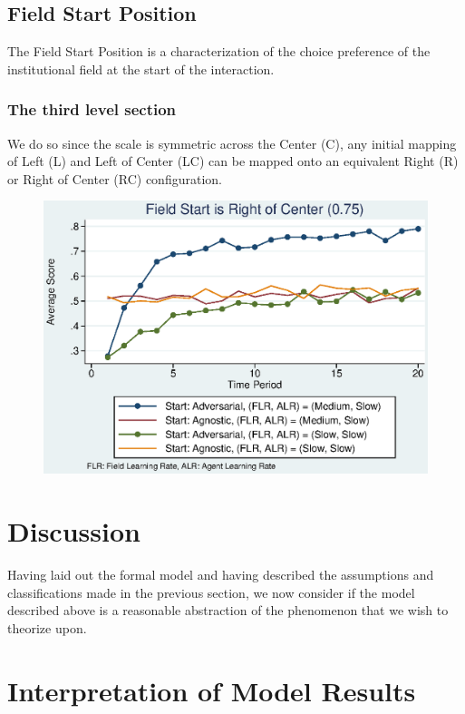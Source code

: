 \documentclass[12pt,letterpaper]{article}
\begin{document}
\subsection{Field Start Position}
The Field Start Position is a characterization of the choice preference of the institutional field at the start of the interaction. 
\subsubsection{The third level section}
We do so since the scale is symmetric across the Center (C), any initial mapping of Left (L) and Left of Center (LC) can be mapped onto an equivalent Right (R) or Right of Center (RC) configuration. 

\begin{figure}[h]
\begin{centering}
  \caption{}
  \includegraphics[width=\textwidth]{frcmedium3a}
  \label{fig:3a}
\end{centering}
\end{figure}

\section{Discussion}
Having laid out the formal model and having described the assumptions and classifications made in the previous section, we now consider if the model described above is a reasonable abstraction of the phenomenon that we wish to theorize upon. 

\section{Interpretation of Model Results}
\end{document}
